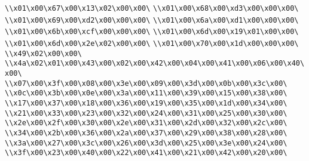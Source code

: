 \verb|\\x01\x00\x67\x00\x13\x02\x00\x00\|\newline
\verb|\\x01\x00\x68\x00\xd3\x00\x00\x00\|\newline
\verb|\\x01\x00\x69\x00\xd2\x00\x00\x00\|\newline
\verb|\\x01\x00\x6a\x00\xd1\x00\x00\x00\|\newline
\verb|\\x01\x00\x6b\x00\xcf\x00\x00\x00\|\newline
\verb|\\x01\x00\x6d\x00\x19\x01\x00\x00\|\newline
\verb|\\x01\x00\x6d\x00\x2e\x02\x00\x00\|\newline
\verb|\\x01\x00\x70\x00\x1d\x00\x00\x00\|\newline
\verb|\\x49\x02\x00\x00\|\newline
\verb|\\x4a\x02\x01\x00\x43\x00\x02\x00\x42\x00\x04\x00\x41\x00\x06\x00\x40\x00\|\newline
\verb|\\x07\x00\x3f\x00\x08\x00\x3e\x00\x09\x00\x3d\x00\x0b\x00\x3c\x00\|\newline
\verb|\\x0c\x00\x3b\x00\x0e\x00\x3a\x00\x11\x00\x39\x00\x15\x00\x38\x00\|\newline
\verb|\\x17\x00\x37\x00\x18\x00\x36\x00\x19\x00\x35\x00\x1d\x00\x34\x00\|\newline
\verb|\\x21\x00\x33\x00\x23\x00\x32\x00\x24\x00\x31\x00\x25\x00\x30\x00\|\newline
\verb|\\x2e\x00\x2f\x00\x30\x00\x2e\x00\x31\x00\x2d\x00\x32\x00\x2c\x00\|\newline
\verb|\\x34\x00\x2b\x00\x36\x00\x2a\x00\x37\x00\x29\x00\x38\x00\x28\x00\|\newline
\verb|\\x3a\x00\x27\x00\x3c\x00\x26\x00\x3d\x00\x25\x00\x3e\x00\x24\x00\|\newline
\verb|\\x3f\x00\x23\x00\x40\x00\x22\x00\x41\x00\x21\x00\x42\x00\x20\x00\|\newline

